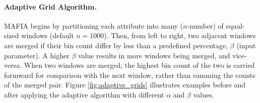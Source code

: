 \paragraph{Adaptive Grid Algorithm.}
MAFIA begins by partitioning each attribute into many ($n$-number) of equal-sized windows (default $n = 1000$). Then, from left to right, two adjacent windows are merged if their bin count differ by less than a predefined percentage, $\beta$ (input parameter). A higher $\beta$ value results in more windows being merged, and vice-versa. When two windows are merged, the highest bin count of the two is carried formward for comparison with the next window, rather than summing the counts of the merged pair. Figure \ref{fig:adaptive_grids} illustrates examples before and after applying the adaptive algorithm with different $\alpha$ and $\beta$ values.

